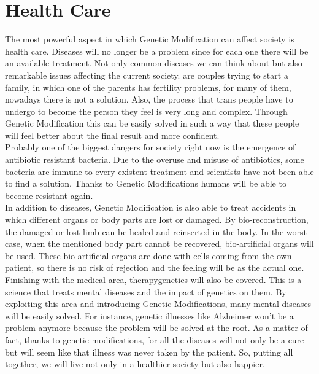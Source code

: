 \section*{Health Care}
\label{sec:health}
The most powerful aspect in which Genetic Modification can affect society is health care. Diseases will no longer be a problem since for each one there will be an available treatment. Not only common diseases we can think about but also remarkable issues affecting the current society. are couples trying to start a family, in which one of the parents has fertility problems, for many of them, nowadays there is not a solution. Also, the process that trans people have to undergo to become the person they feel is very long and complex. Through Genetic Modification this can be easily solved in such a way that these people will feel better about the final result and more confident. \\

Probably one of the biggest dangers for society right now is the emergence of antibiotic resistant bacteria. Due to the overuse and misuse of antibiotics, some bacteria are immune to every existent treatment and scientists have not been able to find a solution. Thanks to Genetic Modifications humans will be able to become resistant again. \\

In addition to diseases, Genetic Modification is also able to treat accidents in which different organs or body parts are lost or damaged. By bio-reconstruction, the damaged or lost limb can be healed and reinserted in the body. In the worst case, when the mentioned body part cannot be recovered, bio-artificial organs will be used. These bio-artificial organs are done with cells coming from the own patient, so there is no risk of rejection and the feeling will be as the actual one. Finishing with the medical area, therapygenetics will also be covered. This is a science that treats mental diseases and the impact of genetics on them. By exploiting this area and introducing Genetic Modifications, many mental diseases will be easily solved. For instance, genetic illnesses like Alzheimer won’t be a problem anymore because the problem will be solved at the root. As a matter of fact, thanks to genetic modifications, for all the diseases will not only be a cure but will seem like that illness was never taken by the patient. So, putting all together, we will live not only in a healthier society but also happier.

